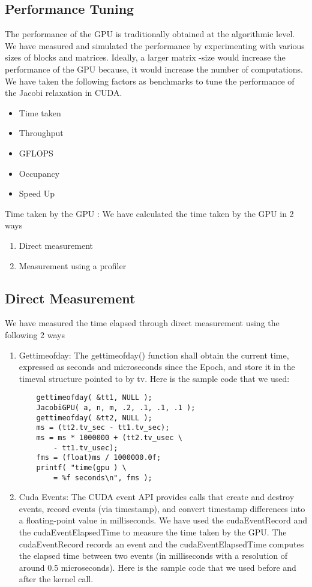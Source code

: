 \documentclass[10pt]{article}
\begin{document}
\begin{multicols}{2}
    \subsection{Performance Tuning}
    The performance of the GPU is traditionally obtained at the algorithmic level.
    We have measured and simulated the performance by experimenting with various sizes of blocks and matrices.
    Ideally, a larger matrix -size would increase the performance of the GPU because,  it would increase  the  number of computations.
    We have taken the following factors as benchmarks to tune the performance of the Jacobi relaxation in CUDA.
    \begin{itemize}
    \item Time taken
    \item Throughput
    \item GFLOPS
    \item Occupancy
    \item Speed Up
    \end{itemize}
    Time taken by the GPU  : We have calculated the time taken by the GPU in 2 ways
    \begin{enumerate}
    \item Direct measurement
    \item Measurement using a profiler
    \end{enumerate}

    \subsection{Direct Measurement} 
    We have measured the time elapsed through direct measurement using the following 2 ways
    \begin{enumerate}
    \item Gettimeofday: The gettimeofday() function shall obtain the current time, expressed as seconds and microseconds since the Epoch, and store it in the timeval structure pointed to by tv.
    Here is the sample code that we used:

    \begin{verbatim}
    gettimeofday( &tt1, NULL );
    JacobiGPU( a, n, m, .2, .1, .1, .1 );
    gettimeofday( &tt2, NULL );
    ms = (tt2.tv_sec - tt1.tv_sec);
    ms = ms * 1000000 + (tt2.tv_usec \
        - tt1.tv_usec);
    fms = (float)ms / 1000000.0f;
    printf( "time(gpu ) \
        = %f seconds\n", fms );
    \end{verbatim}

    \item Cuda Events: The CUDA event API provides calls that create and destroy events, record events (via timestamp), and convert timestamp differences into a floating-point value in milliseconds.
    We have used the cudaEventRecord and the cudaEventElapsedTime to  measure the time taken by the GPU.
    The cudaEventRecord records an event and the cudaEventElapsedTime  computes the elapsed time between two events (in milliseconds with a resolution of around 0.5 microseconds).
    Here is the sample code that we used before and after the kernel call. 


\end{enumerate}
\end{multicols}
\end{document}
